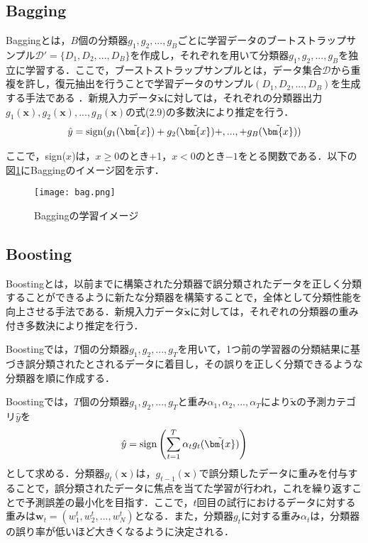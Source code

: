 \subsection{Bagging}
\;\;\;Baggingとは，$B$個の分類器$g_{1},g_{2},...,g_{B}$ごとに学習データのブートストラップサンプル$\mathcal{D}'=\{{D}_{1},{D}_{2},...,{D}_{B}\}$を作成し，それぞれを用いて分類器$g_{1},g_{2},...,g_{B}$を独立に学習する．ここで，ブーストストラップサンプルとは，データ集合$\mathcal{D}$から重複を許し，復元抽出を行うことで学習データのサンプル$({D}_{1},{D}_{2},...,{D}_{B})$を生成する手法である \cite{Miteni99}．新規入力データ$\tilde{\bm{x}}$に対しては，それぞれの分類器出力$g_{1}(\bm{x}),g_{2}(\bm{x}),...,g_{B}(\bm{x})$の式(2.9)の多数決により推定を行う．
\begin{eqnarray}
\hat{y}={\rm sign}(g_{1}(\tilde{\bm{x}})+g_{2}(\tilde{\bm{x}})+,...,+g_{B}(\tilde{\bm{x}}))
\end{eqnarray}

ここで，{\text sign}($x$)は，$x\ge0$のとき+1，$x<0$のとき$-1$をとる関数である．以下の図\ref{ensenble}にBaggingのイメージ図を示す．


\begin{figure}[H]
\centering
\texttt{[image: bag.png]}
\caption{Baggingの学習イメージ}
\label{ensenble}
\end{figure}

\newpage
\subsection{Boosting}
\;\;\;Boostingとは，以前までに構築された分類器で誤分類されたデータを正しく分類することができるように新たな分類器を構築することで，全体として分類性能を向上させる手法である．新規入力データ$\tilde{\bm{x}}$に対しては，それぞれの分類器の重み付き多数決により推定を行う．





Boostingでは，$T$個の分類器$g_{1},g_{2},...,g_{T}$を用いて，1つ前の学習器の分類結果に基づき誤分類されたとされるデータに着目し，その誤りを正しく分類できるような分類器を順に作成する．

Boostingでは，$T$個の分類器$g_{1},g_{2},...,g_{T}$と重み$\alpha_{1},\alpha_{2},...,\alpha_{T}$により$\tilde{\bm{x}}$の予測カテゴリ$\hat{y}$を
\begin{equation}
\hat{y}={\rm sign}\left(\sum^{T}_{t=1}\alpha_{t}g_{t}(\tilde{\bm{x}})\right)
\end{equation}
として求める．分類器$g_{t}({\bm x})$は，$g_{t-1}({\bm x})$で誤分類したデータに重みを付与することで，誤分類されたデータに焦点を当てた学習が行われ，これを繰り返すことで予測誤差の最小化を目指す．ここで，$t$回目の試行におけるデータに対する重みは${\bm w}_{t}=(w^{t}_{1},w^{t}_{2},...,w^{t}_{N})$となる．また，分類器$g_{t}$に対する重み$\alpha_{t}$は，分類器の誤り率が低いほど大きくなるように決定される．

